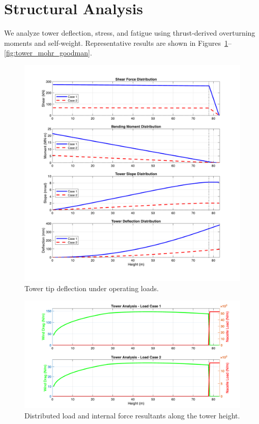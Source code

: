 \documentclass[11pt]{article}
\begin{document}
\section{Structural Analysis}
We analyze tower deflection, stress, and fatigue using thrust-derived overturning moments and self-weight. Representative results are shown in Figures~\ref{fig:tower_deflection}--\ref{fig:tower_mohr_goodman}.

\begin{figure}[h]
  \centering
  \includegraphics[width=0.9\linewidth]{../../PNGS/Tower_Deflection_Analysis.png}
  \caption{Tower tip deflection under operating loads.}
  \label{fig:tower_deflection}
\end{figure}

\begin{figure}[h]
  \centering
  \includegraphics[width=0.9\linewidth]{../../PNGS/Tower_Load_Distribution.png}
  \caption{Distributed load and internal force resultants along the tower height.}
  \label{fig:tower_loads}
\end{figure}
\end{document}
